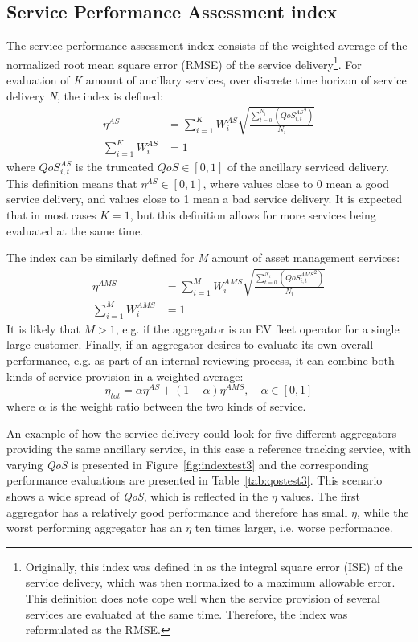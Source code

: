 \subsection{Service Performance Assessment index}
The service performance assessment index consists of the weighted average of the normalized root mean square error (RMSE) of the service delivery\footnote{Originally, this index was defined in \cite{bondy2014performance} as the integral square error (ISE) of the service delivery, which was then normalized to a maximum allowable error. This definition does note cope well when the service provision of several services are evaluated at the same time. Therefore, the index was reformulated as the RMSE.}. For evaluation of \emph{K} amount of ancillary services, over discrete time horizon of service delivery \emph{N}, the index is defined:
\begin{align}\label{eq:MAINetaAS}
\eta^{AS} &= \sum^{K}_{i=1} W^{AS}_i \sqrt{\frac{\sum^{N_i}_{t=0} \left( {QoS^{AS}_{i,t}}^{2} \right)}{N_i}}\\
\sum_{i=1}^K W^{AS}_i &= 1 \label{eq:was}
\end{align}
where $QoS^{AS}_{i,t}$ is the truncated $QoS \in [0,1]$ of the ancillary serviced delivery. This definition means that $\eta^{AS} \in [0,1]$, where values close to 0 mean a good service delivery, and values close to 1 mean a bad service delivery. It is expected that in most cases $K=1$, but this definition allows for more services being evaluated at the same time.

The index can be similarly defined for \emph{M} amount of asset management services:
\begin{align}\label{eq:MAINetaAMS}
\eta^{AMS} &= \sum^{M}_{i=1} W^{AMS}_i \sqrt{\frac{\sum^{N_i}_{t=0} \left( {QoS^{AMS}_{i,t}}^{2} \right)}{N_i}}\\
\sum_{i=1}^M W^{AMS}_i &= 1 \label{eq:wams}
\end{align}
It is likely that $M > 1$, e.g. if the aggregator is an EV fleet operator for a single large customer. Finally, if an aggregator desires to evaluate its own overall performance, e.g. as part of an internal reviewing process, it can combine both kinds of service provision in a weighted average:
\begin{equation}
\eta_{tot} = \alpha \eta^{AS} + (1-\alpha) \eta^{AMS}, \quad \alpha \in [0,1]
\end{equation}
where $\alpha$ is the weight ratio  between the two kinds of service. 

An example of how the service delivery could look for five different aggregators providing the same ancillary service, in this case a reference tracking service, with varying \emph{QoS} is presented in Figure~\ref{fig:indextest3} and the corresponding performance evaluations are presented in Table~\ref{tab:qostest3}. This scenario shows a wide spread of \emph{QoS}, which is reflected in the $\eta$ values. The first aggregator has a relatively good performance and therefore has small $\eta$, while the worst performing aggregator has an $\eta$ ten times larger, i.e. worse performance.

